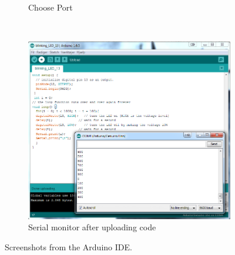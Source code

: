 \begin{figure}[!ht]
\begin{subfigure}{0.47\linewidth}
        \caption{Choose Port}
        \label{fig:choose_port}
    \end{subfigure}\\[1ex]
    \begin{subfigure}{\linewidth}
        \centering
        \includegraphics[width=0.47\linewidth]{Figures/SerialMonitor}
        \caption{Serial monitor after uploading code}
        \label{fig:serial_monitor}
    \end{subfigure}
    \caption{Screenshots from the Arduino IDE.}
    \label{fig:ArduinoScreenshots}
\end{figure}
